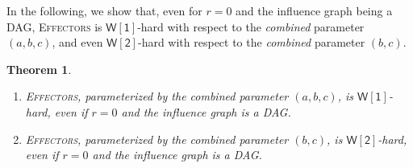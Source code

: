 \documentclass{article}
\newcommand{\wone}{{\mathsf{W[1]}}}
\newcommand{\wtwo}{{\mathsf{W[2]}}}
\newtheorem{theorem}{Theorem}
\newcommand{\probEffectors}{\textsc{Effectors}\xspace}
\begin{document}
In the following, we show that, even for $r = 0$ and the influence
graph being a DAG, \probEffectors is
$\wone$-hard with respect to the \emph{combined} parameter $(a, b, c)$,
and even $\wtwo$-hard with respect to the \emph{combined} parameter $(b,c)$.

\begin{theorem}\label{thm:combinedHardness}
  \mbox{}
  \begin{enumerate}
    \item \probEffectors,
      parameterized by the combined parameter $(a, \allowbreak b, c)$,
      is $\wone$-hard,
      even if $r = 0$
      and the influence graph is a DAG.
    \item \probEffectors,
      parameterized by the combined parameter $(b, c)$,
      is $\wtwo$-hard,
      even if $r = 0$
      and the influence graph is a DAG.
  \end{enumerate}
\end{theorem}
\end{document}
